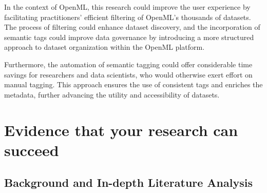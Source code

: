 \documentclass{article}
\begin{document}
In the context of OpenML, this research could improve the user experience by facilitating practitioners' efficient filtering of OpenML's thousands of datasets. The process of filtering could enhance dataset discovery, and the incorporation of semantic tags could improve data governance by introducing a more structured approach to dataset organization within the OpenML platform.


Furthermore, the automation of semantic tagging could offer considerable time savings for researchers and data scientists, who would otherwise exert effort on manual tagging. This approach ensures the use of consistent tags and enriches the metadata, further advancing the utility and accessibility of datasets.


\section{Evidence that your research can succeed}\label{sec:evidence}
\subsection{Background and In-depth Literature Analysis}\label{sec:background}
\end{document}

